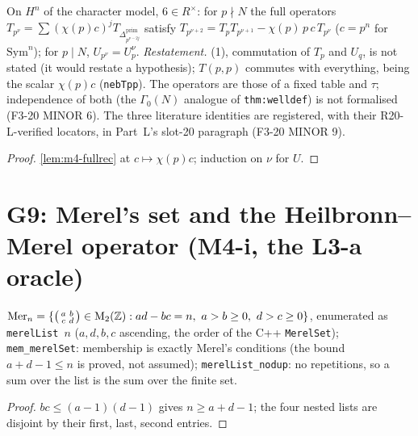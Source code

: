 \begin{theorem}\label{thm:nebrelations-model}
  \leanok
  On $H^n$ of the character model, $6\in R^\times$: for $p\nmid N$ the full operators $T_{p^\nu}=\sum(\chi(p)c)^jT_{\Delta^{\mathrm{prim}}_{p^{\nu-2j}}}$
  satisfy $T_{p^{\nu+2}}=T_pT_{p^{\nu+1}}-\chi(p)\,p\,c\,T_{p^\nu}$ ($c=p^n$ for $\mathrm{Sym}^n$); for $p\mid N$, $U_{p^\nu}=U_p^\nu$.
  \emph{Restatement.} (1), commutation of $T_p$ and $U_q$, is not stated (it would restate a hypothesis); $T(p,p)$ commutes with
  everything, being the scalar $\chi(p)c$ (\texttt{nebTpp}). The operators are those of a fixed table and $\tau$; independence of
  both (the $\Gamma_0(N)$ analogue of \texttt{thm:welldef}) is not formalised (F3-20 MINOR 6). The three literature identities
  are registered, with their R20-L-verified locators, in Part~L's slot-20 paragraph (F3-20 MINOR 9).
\end{theorem}
\begin{proof}
  \leanok
  \ref{lem:m4-fullrec} at $c\mapsto\chi(p)c$; induction on $\nu$ for $U$.
\end{proof}

\section{G9: Merel's set and the Heilbronn--Merel operator (M4-i, the L3-a oracle)}

\begin{definition}\label{def:merelset-model}
  \leanok
  $\mathrm{Mer}_n=\{\left(\begin{smallmatrix}a&b\\c&d\end{smallmatrix}\right)\in\mathrm M_2(\mathbb Z):ad-bc=n,\ a>b\ge0,\ d>c\ge0\}$, enumerated as \texttt{merelList}~$n$ ($a,d,b,c$
  ascending, the order of the C++ \texttt{MerelSet}); \texttt{mem\_merelSet}: membership is exactly Merel's conditions (the bound
  $a+d-1\le n$ is proved, not assumed); \texttt{merelList\_nodup}: no repetitions, so a sum over the list is the sum over the finite set.
\end{definition}
\begin{proof}
  \leanok
  $bc\le(a-1)(d-1)$ gives $n\ge a+d-1$; the four nested lists are disjoint by their first, last, second entries.
\end{proof}

